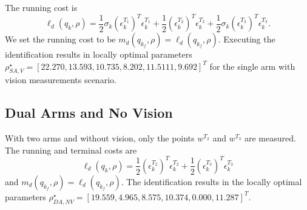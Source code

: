 \documentclass[runningheads,a4paper]{llncs}
\begin{document}

The running cost is 
\[
\ell_d(q_k,\rho) = \frac{1}{2}\sigma_k (\epsilon^{T_1}_k)^T\epsilon^{T_1}_k + \frac{1}{2} (\epsilon^{T_2}_k)^T\epsilon^{T_2}_k +\frac{1}{2}\sigma_k (\epsilon^{T_3}_k)^T\epsilon^{T_3}_k.
\]
We set the running cost to be $m_d(q_{k_f},\rho) = \ell_d(q_{k_f},\rho)$. Executing the identification results in locally optimal parameters $\rho^\star_{SA,V} = [22.270 , 13.593 , 10.735 ,  8.202  ,11.5111,   9.692]^T$ for the single arm with vision measurements scenario.

\subsection{Dual Arms and No Vision \label{sec-2_no_vis}}
With two arms and without vision, only the points $w^{T_2}$ and $w^{T_3}$ are measured. The running and terminal costs are 
\[
\ell_d(q_k,\rho) = \frac{1}{2}(\epsilon^{T_2}_k)^T\epsilon^{T_2}_k +\frac{1}{2}(\epsilon^{T_3}_k)^T\epsilon^{T_3}_k 
\]
and $m_d(q_{k_f},\rho) = \ell_d(q_{k_f},\rho)$. The identification results in the locally optimal parameters $\rho^\star_{DA,NV} = [19.559, 4.965, 8.575, 10.374, 0.000, 11.287]^T$.
\end{document}
